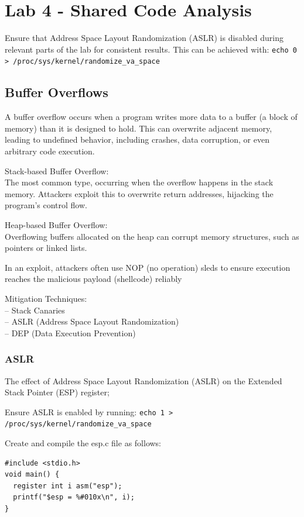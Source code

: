 \documentclass[]{project_plan}
\begin{document}
\chapter{Lab 4 -  Shared Code Analysis}

Ensure that Address Space Layout Randomization (ASLR) is disabled
during relevant parts of the lab for consistent results. This can be achieved
with: \lstinline|echo 0 > /proc/sys/kernel/randomize_va_space|

\section{Buffer Overflows}

A buffer overflow occurs when a program writes more data to a buffer (a block of
memory) than it is designed to hold. This can overwrite adjacent memory, leading
to undefined behavior, including crashes, data corruption, or even arbitrary
code execution.

Stack-based Buffer Overflow:\\The most common type, occurring when
the overflow happens in the stack memory. Attackers exploit this to overwrite
return addresses, hijacking the program’s control flow.

Heap-based Buffer Overflow:\\ Overflowing buffers allocated on the
heap can corrupt memory structures, such as pointers or linked lists.

In an exploit, attackers often use NOP
(no operation) sleds to ensure execution reaches the malicious payload
(shellcode) reliably

Mitigation Techniques:\\
– Stack Canaries\\
– ASLR (Address Space Layout Randomization)\\
– DEP (Data Execution Prevention)

\subsection{ASLR}

The effect of Address Space Layout Randomization (ASLR) on the Extended
Stack Pointer (ESP) register;

Ensure ASLR is enabled by running:
\lstinline|echo 1 > /proc/sys/kernel/randomize_va_space|

Create and compile the esp.c file as follows:
\begin{lstlisting}
#include <stdio.h>
void main() {
  register int i asm("esp");
  printf("$esp = %#010x\n", i);
}
\end{lstlisting}
\end{document}
